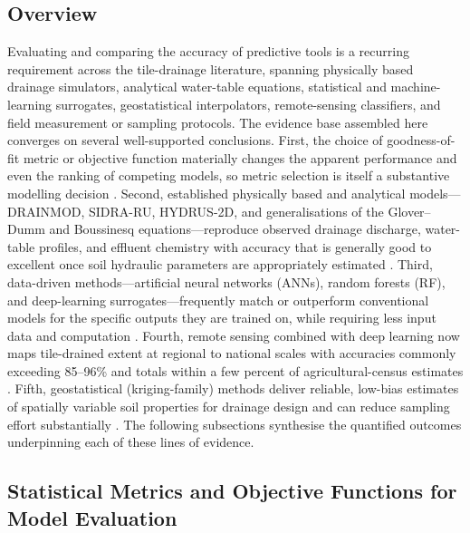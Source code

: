 \subsection{Overview}

Evaluating and comparing the accuracy of predictive tools is a recurring
requirement across the tile-drainage literature, spanning physically based
drainage simulators, analytical water-table equations, statistical and
machine-learning surrogates, geostatistical interpolators, remote-sensing
classifiers, and field measurement or sampling protocols. The evidence base
assembled here converges on several well-supported conclusions. First, the
choice of goodness-of-fit metric or objective function materially changes the
apparent performance and even the ranking of competing models, so metric
selection is itself a substantive modelling decision \parencite{Bruhn2025,STONE1995,SAVABI1995}.
Second, established physically based and analytical models---DRAINMOD, SIDRA-RU,
HYDRUS-2D, and generalisations of the Glover--Dumm and Boussinesq equations---reproduce
observed drainage discharge, water-table profiles, and effluent chemistry with
accuracy that is generally good to excellent once soil hydraulic parameters are
appropriately estimated \parencite{Salazar2008,Jeantet2021,Naderi2025,Mehdinejadiani2013,Mehdinejadiani2020}.
Third, data-driven methods---artificial neural networks (ANNs), random forests
(RF), and deep-learning surrogates---frequently match or outperform conventional
models for the specific outputs they are trained on, while requiring less input
data and computation \parencite{Sarangi2006,Yang2000,Djiemon2019,Ellafi2021,Lei2026}.
Fourth, remote sensing combined with deep learning now maps tile-drained extent
at regional to national scales with accuracies commonly exceeding 85--96\% and
totals within a few percent of agricultural-census estimates \parencite{Valayamkunnath2020,Wan2024,Redoloza2023}.
Fifth, geostatistical (kriging-family) methods deliver reliable, low-bias
estimates of spatially variable soil properties for drainage design and can
reduce sampling effort substantially \parencite{GALLICHAND1991,GALLICHAND1992,Moustafa1998b}.
The following subsections synthesise the quantified outcomes underpinning each
of these lines of evidence.

\subsection{Statistical Metrics and Objective Functions for Model Evaluation}


